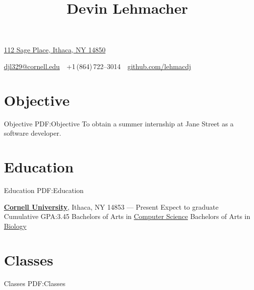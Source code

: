 \documentclass[letterpaper,10pt,oneside]{simpleresume}
\newcommand{\CVAuthor}{Devin Lehmacher}
\newcommand{\CVCompany}{Jane Street}
\newcommand{\CVWebpage}{github.com/lehmacdj}
\begin{document}
\begin{minipage}[t][0pt]{\linewidth}
\pagestyle{empty}

\title{\CVAuthor}

\begin{subtitle}
\href{https://www.google.com/maps/place/112+Sage+Pl+Room-B09,+Ithaca,+NY+14850}
{112 Sage Place, Ithaca, NY 14850}
\par
\href{mailto:djl329@cornell.edu}
{djl329@cornell.edu}
\,\SubBulletSymbol\,
+1\,(864)\,722--3014
\,\SubBulletSymbol\,
\href{https://\CVWebpage}
{\CVWebpage}
\end{subtitle}

\begin{body}

\section%
{Objective}
{Objective}
{PDF:Objective}
To obtain a summer internship at \CVCompany{} as a software developer.

\section%
{Education}
{Education}
{PDF:Education}

\href{https://www.cornell.edu}
{\textbf{Cornell University}},
Ithaca, NY 14853
\hfill
{} --- Present
\BulletItem%
Expect to graduate 
\BulletItem%
Cumulative GPA:\@ 3.45
\BulletItem%
Bachelors of Arts in
\href{https://www.cs.cornell.edu}{Computer Science}
\BulletItem%
Bachelors of Arts in
\href{https://www.biology.cornell.edu}{Biology}

\section%
{Classes}
{Classes}
{PDF:Classes}


\end{body}
\end{minipage}
\end{document}
